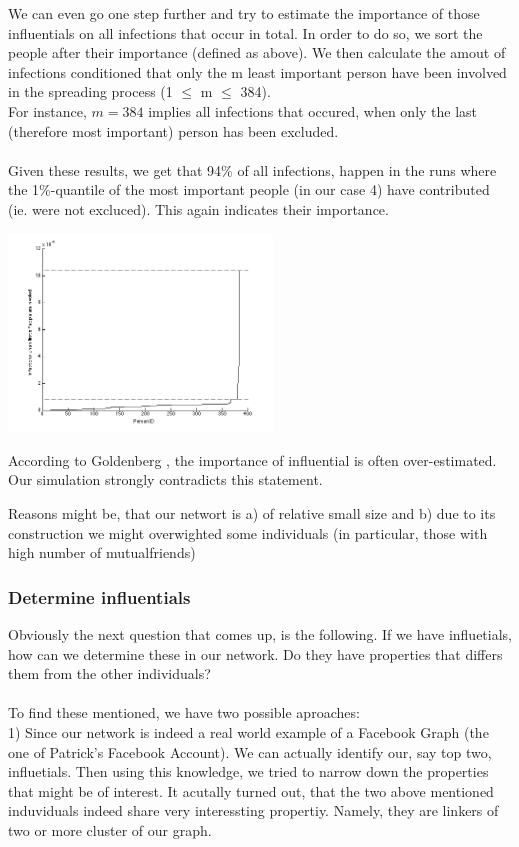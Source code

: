 We can even go one step further and try to estimate the importance of those influentials on all infections that occur in total. In order to do so, we sort the people after their importance (defined as above). We then calculate the amout of infections conditioned that only the m least important person have been involved in the spreading process (1 $\le$ m $\le$ 384).\\
For instance, $m=384$ implies all infections that occured, when only the last (therefore most important) person has been excluded.\\
\\
Given these results, we get that 94\% of all infections, happen in the runs where the 1\%-quantile of the most important people (in our case 4) have contributed (ie. were not excluced). This again indicates their importance.

\includegraphics[width=7cm]{influ3}


According to Goldenberg \cite{word2mouth}, the importance of influential is often over-estimated. Our simulation strongly contradicts this statement. 

Reasons might be, that our networt is a) of relative small size and b) due to its construction we might overwighted some individuals (in particular, those with high number of mutualfriends)


\subsubsection{Determine influentials}

Obviously the next question that comes up, is the following. If we have influetials, how can we determine these in our network. Do they have properties that differs them from the other individuals? \\ 
\\
To find these mentioned, we have two possible aproaches: 
\\

1) Since our network is indeed a real world example of a Facebook Graph (the one of Patrick's Facebook Account). We can actually identify our, say top two, influetials. Then using this knowledge, we tried to narrow down the properties that might be of interest. 
It acutally turned out, that the two above mentioned induviduals indeed share very interessting propertiy. Namely, they are linkers of two or more cluster of our graph. 

